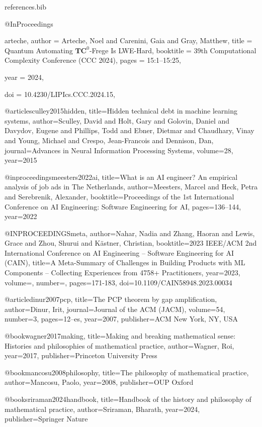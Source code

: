 \begin{filecontents}{references.bib}

@InProceedings{arteche,
  author =	{Arteche, Noel and Carenini, Gaia and Gray, Matthew},
  title =	{{Quantum Automating $\mathbf{TC}^0$-Frege Is LWE-Hard}},
  booktitle =	{39th Computational Complexity Conference (CCC 2024)},
  pages =	{15:1--15:25},
  
  year =	{2024},
  
  doi =		{10.4230/LIPIcs.CCC.2024.15},
}

@article{sculley2015hidden,
  title={Hidden technical debt in machine learning systems},
  author={Sculley, David and Holt, Gary and Golovin, Daniel and Davydov, Eugene and Phillips, Todd and Ebner, Dietmar and Chaudhary, Vinay and Young, Michael and Crespo, Jean-Francois and Dennison, Dan},
  journal={Advances in Neural Information Processing Systems},
  volume={28},
  year={2015}
}

@inproceedings{meesters2022ai,
  title={What is an {AI} engineer? An empirical analysis of job ads in {T}he {N}etherlands},
  author={Meesters, Marcel and Heck, Petra and Serebrenik, Alexander},
  booktitle={Proceedings of the 1st International Conference on AI Engineering: Software Engineering for AI},
  pages={136--144},
  year={2022}
}


@INPROCEEDINGS{meta,
  author={Nahar, Nadia and Zhang, Haoran and Lewis, Grace and Zhou, Shurui and Kästner, Christian},
  booktitle={2023 IEEE/ACM 2nd International Conference on AI Engineering – Software Engineering for AI (CAIN)}, 
  title={A Meta-Summary of Challenges in Building Products with {ML} Components – Collecting Experiences from 4758+ Practitioners}, 
  year={2023},
  volume={},
  number={},
  pages={171-183},
  doi={10.1109/CAIN58948.2023.00034}}


@article{dinur2007pcp,
  title={The {PCP} theorem by gap amplification},
  author={Dinur, Irit},
  journal={Journal of the ACM (JACM)},
  volume={54},
  number={3},
  pages={12--es},
  year={2007},
  publisher={ACM New York, NY, USA}
}

@book{wagner2017making,
  title={Making and breaking mathematical sense: Histories and philosophies of mathematical practice},
  author={Wagner, Roi},
  year={2017},
  publisher={Princeton University Press}
}

@book{mancosu2008philosophy,
  title={The philosophy of mathematical practice},
  author={Mancosu, Paolo},
  year={2008},
  publisher={OUP Oxford}
}

@book{sriraman2024handbook,
  title={Handbook of the history and philosophy of mathematical practice},
  author={Sriraman, Bharath},
  year={2024},
  publisher={Springer Nature}
}


\end{filecontents}


